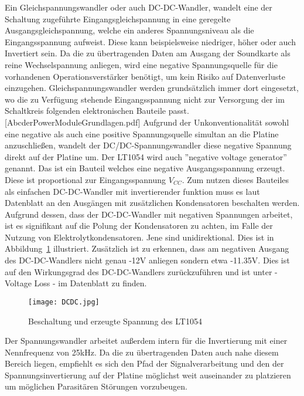 Ein Gleichspannungswandler oder auch DC-DC-Wandler, wandelt eine der Schaltung zugeführte Eingangsgleichspannung in eine geregelte Ausgangsgleichspannung, welche ein anderes Spannungsniveau als die Eingangsspannung aufweist. Diese kann beispielsweise niedriger, höher oder auch Invertiert sein.
Da die zu übertragenden Daten am Ausgang der Soundkarte als reine Wechselspannung anliegen, wird eine negative Spannungsquelle für die vorhandenen Operationsverstärker benötigt, um kein Risiko auf Datenverluste einzugehen.
Gleichspannungswandler werden grundsätzlich immer dort eingesetzt, wo die zu Verfügung stehende Eingangsspannung nicht zur Versorgung der im Schaltkreis folgenden elektronischen Bauteile passt.[AbcderPowerModuleGrundlagen.pdf] Aufgrund der Unkonventionalität sowohl eine negative als auch eine positive Spannungsquelle simultan an die Platine anzuschließen, wandelt der DC/DC-Spannungswandler diese negative Spannung direkt auf der Platine um. Der LT1054 wird auch ”negative voltage generator” genannt. Das ist ein Bauteil welches eine negative Ausgangsspannung erzeugt. Diese ist proportional zur Eingangsspannung $V_{CC}$. Zum nutzen dieses Bauteiles als einfachen DC-DC-Wandler mit invertierender funktion muss es laut Datenblatt an den Ausgängen mit zusätzlichen Kondensatoren beschalten werden. Aufgrund dessen, dass der DC-DC-Wandler mit negativen Spannungen arbeitet, ist es signifikant auf die Polung der Kondensatoren zu achten, im Falle der Nutzung von Elektrolytkondensatoren. Jene sind unidirektional. Dies ist in Abbildung~\ref{fig:DCDC} illustriert. Zusätzlich ist zu erkennen, dass am negativen Ausgang des DC-DC-Wandlers nicht genau -12V anliegen sondern etwa -11.35V. Dies ist auf den Wirkungsgrad des DC-DC-Wandlers zurückzuführen und ist unter - Voltage Loss - im Datenblatt zu finden. 

\begin{figure}[H]
	\centering
	\texttt{[image: DCDC.jpg]}
	\caption[Beschaltung und erzeugte Spannung des LT1054]{Beschaltung und erzeugte Spannung des LT1054} 
	\cite{LT1054} \cite{Eigene Darstellung}
	\label{fig:DCDC}
\end{figure}

Der Spannungswandler arbeitet außerdem intern für die Invertierung mit einer Nennfrequenz von 25kHz. Da die zu übertragenden Daten auch nahe diesem Bereich liegen, empfiehlt es sich den Pfad der Signalverarbeitung und den der Spannungsinvertierung auf der Platine möglichst weit auseinander zu platzieren um möglichen Parasitären Störungen vorzubeugen.


